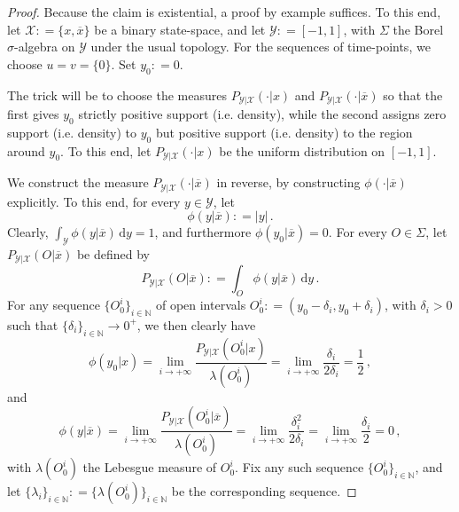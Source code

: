 \documentclass[twoside,11pt]{article}
\newcommand{\nats}{\mathbb{N}}
\newcommand{\states}{\mathcal{X}}
\newcommand{\observs}{\mathcal{Y}}
\newcommand{\abs}[1]{\left\vert #1 \right\vert}
\newcommand{\coloneqq}{:\!=}
\begin{document}
\begin{proof}
Because the claim is existential, a proof by example suffices. To this end, let $\states\coloneqq\{x,\overline{x}\}$ be a binary state-space, and let $\observs\coloneqq [-1,1]$, with $\Sigma$ the Borel $\sigma$-algebra on $\observs$ under the usual topology. For the sequences of time-points, we choose $u=v=\{0\}$. Set $y_0\coloneqq 0$.

The trick will be to choose the measures $P_{\observs\vert\states}(\cdot\vert x)$ and $P_{\observs\vert\states}(\cdot\vert \overline{x})$ so that the first gives $y_0$ strictly positive support (i.e. density), while the second assigns zero support (i.e. density) to $y_0$ but positive support (i.e. density) to the region around $y_0$. To this end, let $P_{\observs\vert\states}(\cdot\vert x)$ be the uniform distribution on $[-1,1]$.

We construct the measure $P_{\observs\vert\states}(\cdot\vert \overline{x})$ in reverse, by constructing $\phi(\cdot\vert\overline{x})$ explicitly. To this end, for every $y\in\observs$, let
\begin{equation*}
\phi(y\vert\overline{x}) \coloneqq \abs{y}\,.
\end{equation*}
Clearly, $\int_\observs \phi(y\vert\overline{x})\,\mathrm{d}y = 1$, and furthermore $\phi(y_0\vert\overline{x})=0$. For every $O\in\Sigma$, let $P_{\observs\vert\states}(O\vert\overline{x})$ be defined by
\begin{equation*}
P_{\observs\vert\states}(O\vert\overline{x}) \coloneqq \int_O\phi(y\vert\overline{x})\,\mathrm{d}y\,.
\end{equation*}
For any sequence $\{O_0^i\}_{i\in\nats}$ of open intervals $O_0^i\coloneqq (y_0-\delta_i,y_0+\delta_i)$, with $\delta_i>0$ such that $\{\delta_i\}_{i\in\nats}\to0^+$, we then clearly have
\begin{equation*}
\phi(y_0\vert x) = \lim_{i\to+\infty} \frac{P_{\observs\vert\states}(O_0^i\vert x)}{\lambda(O_0^i)} = \lim_{i\to+\infty} \frac{\delta_i}{2\delta_i} = \frac{1}{2}\,,
\end{equation*}
and
\begin{equation*}
\phi(y\vert \overline{x}) = \lim_{i\to+\infty} \frac{P_{\observs\vert\states}(O_0^i\vert \overline{x})}{\lambda(O_0^i)} = \lim_{i\to+\infty} \frac{\delta_i^2}{2\delta_i} = \lim_{i\to+\infty} \frac{\delta_i}{2} = 0\,,
\end{equation*}
with $\lambda(O_0^i)$ the Lebesgue measure of $O_0^i$. Fix any such sequence $\{O_0^i\}_{i\in\nats}$, and let $\{\lambda_i\}_{i\in\nats}\coloneqq\{\lambda(O_0^i)\}_{i\in\nats}$ be the corresponding sequence.


\end{proof}
\end{document}
